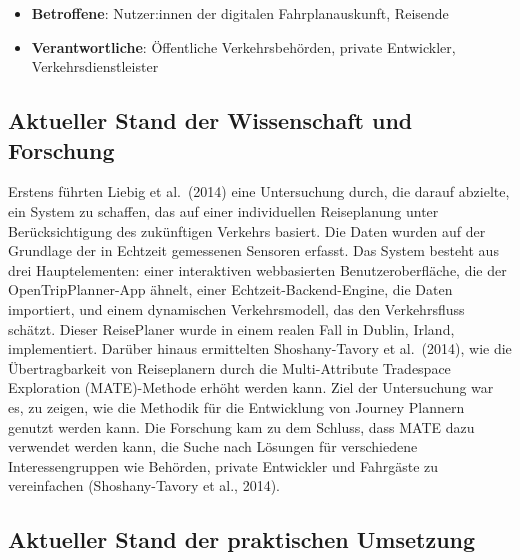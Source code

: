 \documentclass[
]{book}
\providecommand{\tightlist}{%
  \setlength{\itemsep}{0pt}\setlength{\parskip}{0pt}}
\begin{document}
\begin{itemize}
\tightlist
\item
  \textbf{Betroffene}: Nutzer:innen der digitalen Fahrplanauskunft, Reisende
\item
  \textbf{Verantwortliche}: Öffentliche Verkehrsbehörden, private Entwickler, Verkehrsdienstleister
\end{itemize}

\hypertarget{aktueller-stand-der-wissenschaft-und-forschung-20}{%
\subsection*{Aktueller Stand der Wissenschaft und Forschung}\label{aktueller-stand-der-wissenschaft-und-forschung-20}}

Erstens führten Liebig et al.~(2014) eine Untersuchung durch, die darauf abzielte, ein System zu schaffen, das auf einer individuellen Reiseplanung unter Berücksichtigung des zukünftigen Verkehrs basiert. Die Daten wurden auf der Grundlage der in Echtzeit gemessenen Sensoren erfasst. Das System besteht aus drei Hauptelementen: einer interaktiven webbasierten Benutzeroberfläche, die der OpenTripPlanner-App ähnelt, einer Echtzeit-Backend-Engine, die Daten importiert, und einem dynamischen Verkehrsmodell, das den Verkehrsfluss schätzt. Dieser ReisePlaner wurde in einem realen Fall in Dublin, Irland, implementiert.
Darüber hinaus ermittelten Shoshany-Tavory et al.~(2014), wie die Übertragbarkeit von Reiseplanern durch die Multi-Attribute Tradespace Exploration (MATE)-Methode erhöht werden kann. Ziel der Untersuchung war es, zu zeigen, wie die Methodik für die Entwicklung von Journey Plannern genutzt werden kann. Die Forschung kam zu dem Schluss, dass MATE dazu verwendet werden kann, die Suche nach Lösungen für verschiedene Interessengruppen wie Behörden, private Entwickler und Fahrgäste zu vereinfachen (Shoshany-Tavory et al., 2014).

\hypertarget{aktueller-stand-der-praktischen-umsetzung-20}{%
\subsection*{Aktueller Stand der praktischen Umsetzung}\label{aktueller-stand-der-praktischen-umsetzung-20}}
\end{document}
